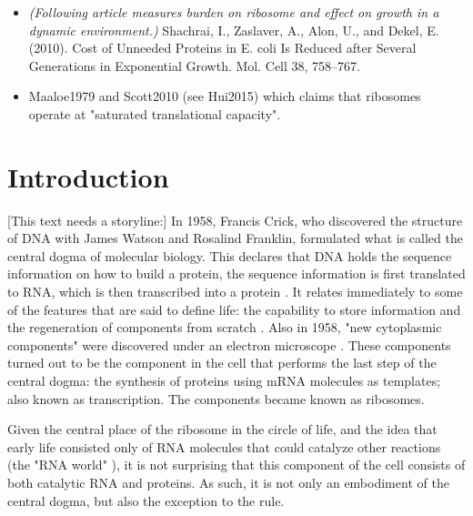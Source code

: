 {\begin{itemize}
    \item \textit{(Following article measures burden on ribosome and effect on growth in a dynamic environment.)} Shachrai, I., Zaslaver, A., Alon, U., and Dekel, E. (2010). Cost of Unneeded Proteins in E. coli Is Reduced after Several Generations in Exponential Growth. Mol. Cell 38, 758–767.
    \cite{Shachrai2010}
\item Maaloe1979 and Scott2010 (see Hui2015) which claims that ribosomes operate at "saturated translational capacity".
\end{itemize} 


}

\section{Introduction}


{\color{red}[This text needs a storyline:]}
%
%
In 1958, Francis Crick, who discovered the structure of DNA with James Watson and Rosalind Franklin,
formulated what is called the central dogma of molecular biology.
This declares that DNA holds the sequence information on how to build a protein, the sequence information is first translated to RNA, which is then transcribed into a protein \cite{Crick1958}.
% 
It relates immediately to some of the features that are said to define life: 
the capability to store information and 
the regeneration of components from scratch \cite{Lawrence2005, Koshland2002}.
%
Also in 1958, "new cytoplasmic components" were discovered under an electron microscope \cite{Palade1955}.
These components turned out to be the component in the cell that performs the last step of the central dogma: 
the synthesis of proteins using mRNA molecules as templates; also known as transcription.
The components became known as ribosomes.

Given the central place of the ribosome in the circle of life, and the idea that early life consisted only of RNA molecules that could catalyze other reactions (the "RNA world" \cite{Campbell2002}), it is not surprising that this component of the cell consists of both catalytic RNA and proteins.
As such, it is not only an embodiment of the central dogma, but also the exception to the rule.


